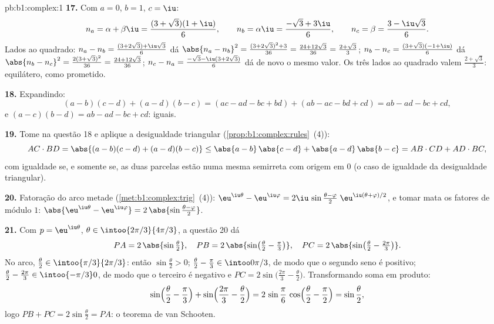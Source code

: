 \begin{solution}{pb:b1:complex:1}
\textbf{17.} Com $a = 0$, $b = 1$, $c = \iu$:
\[
n_a = \alpha + \beta\iu = \frac{(3 + \sqrt3)(1 + \iu)}6,
\qquad
n_b = \alpha\iu = \frac{-\sqrt3 + 3\iu}6,
\qquad
n_c = \beta = \frac{3 - \iu\sqrt3}6 .
\]
Lados ao quadrado: $n_a - n_b = \frac{(3 + 2\sqrt3) +
\iu\sqrt3}6$ dá $\abs{n_a - n_b}^2 = \frac{(3 + 2\sqrt3)^2 +
3}{36} = \frac{24 + 12\sqrt3}{36} = \frac{2 + \sqrt3}3$; $n_b -
n_c = \frac{(3 + \sqrt3)(-1 + \iu)}6$ dá $\abs{n_b - n_c}^2 =
\frac{2(3 + \sqrt3)^2}{36} = \frac{24 + 12\sqrt3}{36}$; $n_c - n_a
= \frac{-\sqrt3 - \iu(3 + 2\sqrt3)}6$ dá de novo o mesmo valor.
Os três lados ao quadrado valem $\frac{2 + \sqrt3}3$: equilátero,
como prometido.

\textbf{18.} Expandindo:
\[
(a - b)(c - d) + (a - d)(b - c)
= (ac - ad - bc + bd) + (ab - ac - bd + cd)
= ab - ad - bc + cd ,
\]
e $(a - c)(b - d) = ab - ad - bc + cd$: iguais.

\textbf{19.} Tome  na questão 18 e aplique a desigualdade
triangular (\cref{prop:b1:complex:rules}~(4)):
\[
AC \cdot BD = \abs{(a-b)(c-d) + (a-d)(b-c)}
\leq \abs{a-b}\,\abs{c-d} + \abs{a-d}\,\abs{b-c}
= AB \cdot CD + AD \cdot BC ,
\]
com igualdade se, e somente se, as duas parcelas estão numa mesma
semirreta com origem em $0$ (o caso de igualdade da desigualdade
triangular).

\textbf{20.} Fatoração do arco metade
(\cref{met:b1:complex:trig}~(4)):
$\eu^{\iu\theta} - \eu^{\iu\varphi} = 2\iu\,\sin\frac{\theta -
\varphi}2\;\eu^{\iu(\theta + \varphi)/2}$, e tomar  mata
os fatores de módulo $1$: $\abs{\eu^{\iu\theta} - \eu^{\iu\varphi}}
= 2\,\abs{\sin\frac{\theta - \varphi}2}$.

\textbf{21.} Com $p = \eu^{\iu\theta}$, $\theta \in
\intoo{2\pi/3}{4\pi/3}$, a questão 20 dá
\[
PA = 2\,\abs{\sin\tfrac\theta2},
\quad
PB = 2\,\abs{\sin\bigl(\tfrac\theta2 - \tfrac\pi3\bigr)},
\quad
PC = 2\,\abs{\sin\bigl(\tfrac\theta2 - \tfrac{2\pi}3\bigr)} .
\]
No arco, $\frac\theta2 \in \intoo{\pi/3}{2\pi/3}$: então
$\sin\frac\theta2 > 0$; $\frac\theta2 - \frac\pi3 \in
\intoo0{\pi/3}$, de modo que o segundo seno é positivo; $\frac\theta2 -
\frac{2\pi}3 \in \intoo{-\pi/3}0$, de modo que o terceiro é negativo e
$PC = 2\sin\bigl(\frac{2\pi}3 - \frac\theta2\bigr)$. Transformando soma em
produto:
\[
\sin\Bigl(\frac\theta2 - \frac\pi3\Bigr) +
\sin\Bigl(\frac{2\pi}3 - \frac\theta2\Bigr)
= 2\,\sin\frac\pi6\,\cos\Bigl(\frac\theta2 - \frac\pi2\Bigr)
= \sin\frac\theta2 ,
\]
logo $PB + PC = 2\sin\frac\theta2 = PA$: o teorema de van Schooten.


\end{solution}
